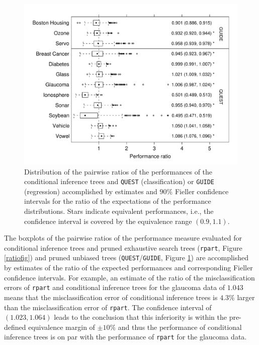 \begin{figure}[t]
\begin{center}
\includegraphics[width = \textwidth]{ratioboxQUEST_GUIDE}
\caption{Distribution of the pairwise ratios of the performances of the
         conditional inference trees and
         \texttt{QUEST} (classification) or \texttt{GUIDE} (regression) 
         accomplished by estimates and $90\%$ Fieller confidence intervals for
         the ratio of the expectations of the performance distributions. 
         Stars indicate equivalent performances, i.e., the confidence interval 
         is covered by the equivalence range $(0.9, 1.1)$.\label{ratiofigQG}}
\end{center}
\end{figure}


The boxplots of the pairwise ratios of the performance measure evaluated for
conditional inference trees and pruned exhaustive search trees
(\texttt{rpart}, Figure \ref{ratiofig}) and pruned unbiased trees 
(\texttt{QUEST}/\texttt{GUIDE}, Figure \ref{ratiofigQG}) are accomplished by
estimates of the ratio of the expected performances and corresponding
Fieller confidence intervals. For example, an estimate of the ratio 
of the misclassification errors 
of \texttt{rpart} and conditional inference trees for the glaucoma data of
$1.043$ means that the misclassification error of conditional inference
trees is $4.3\%$ larger than the misclassification error of \texttt{rpart}.
The confidence interval of $(1.023, 1.064)$ leads to the conclusion that
this inferiority is within the pre-defined equivalence margin of
$\pm 10\%$ and thus the performance of conditional inference trees is on par
with the performance of \texttt{rpart} for the glaucoma data.

